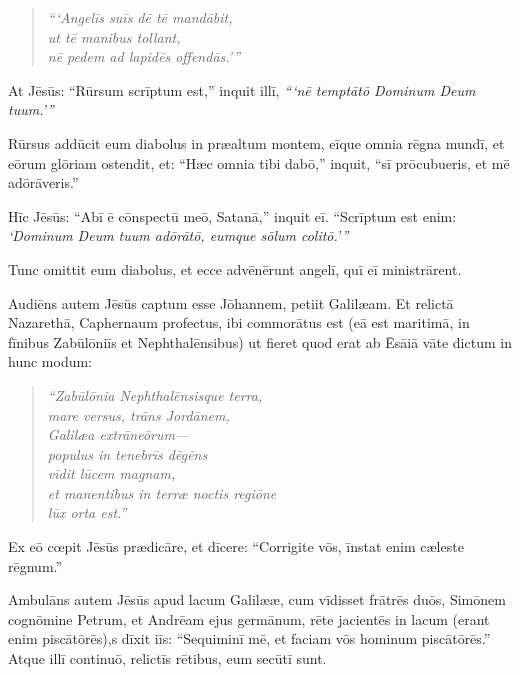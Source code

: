 \begin{verse}
\begin{patverse*}
\emph{``{}`Angelīs suīs dē tē mandābit,\\
ut tē manibus tollant,\\
nē pedem ad lapidēs offendās.'{}''}
\end{patverse*}
\end{verse}

\Versus At Jēsūs: ``Rūrsum scrīptum est,'' inquit illī, \emph{``{}`nē temptātō Dominum Deum tuum.'{}''}

\Versus Rūrsus addūcit eum diabolus in præaltum montem, eīque omnia rēgna mundī, et eōrum glōriam ostendit, 
\Versus et: ``Hæc omnia tibi dabō,'' inquit, ``sī prōcubueris, et mē adōrāveris.''

\Versus Hīc Jēsūs: ``Abī ē cōnspectū meō, Satanā,'' inquit eī. ``Scrīptum est enim: \emph{`Dominum Deum tuum adōrātō, eumque sōlum colitō.'{}''}

\Versus Tunc omittit eum diabolus, et ecce advēnērunt angelī, quī eī ministrārent.

\Versus Audiēns autem Jēsūs captum esse Jōhannem, petiit Galilæam. 
\Versus Et relictā Nazarethā, Caphernaum profectus, ibi commorātus est (eā est maritimā, in fīnibus Zabūlōniīs et Nephthalēnsibus)
\Versus ut fieret quod erat ab Ēsāiā vāte dictum in hunc modum:

\begin{verse}
\begin{patverse*}
\Versus \emph{``Zabūlōnia Nephthalēnsisque terra,\\
mare versus, trāns Jordānem,\\
Galilæa extrāneōrum—}\\
\Versus \emph{populus in tenebrīs dēgēns\\
vīdit lūcem magnam,\\
et manentibus in terræ noctis regiōne\\
lūx orta est.''}
\end{patverse*}
\end{verse}

\Versus Ex eō cœpit Jēsūs prædicāre, et dīcere: ``Corrigite vōs, īnstat enim cæleste rēgnum.''

\Versus Ambulāns autem Jēsūs apud lacum Galilææ, cum vīdisset frātrēs duōs, Simōnem cognōmine Petrum, et Andrēam ejus germānum, rēte jacientēs in lacum (erant enim piscātōrēs),s 
\Versus dīxit iīs: ``Sequiminī mē, et faciam vōs hominum piscātōrēs.'' 
\Versus Atque illī continuō, relictīs rētibus, eum secūtī sunt.

